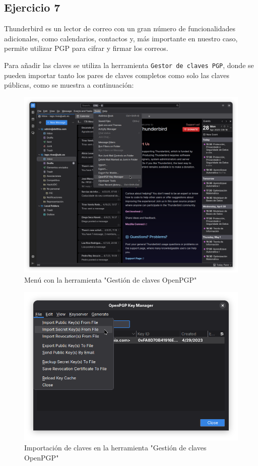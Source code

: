 \subsection{Ejercicio 7}
\graphicspath{ {img/07} }

Thunderbird es un lector de correo con un gran número de funcionalidades adicionales, como calendarios, contactos y, más importante en nuestro caso, permite utilizar PGP para cifrar y firmar los correos.

Para añadir las claves se utiliza la herramienta \texttt{Gestor de claves PGP}, donde se pueden importar tanto los pares de claves completos como solo las claves públicas, como se muestra a continuación:

\begin{figure}[H]
    \includegraphics[width=15cm]{thunderbird-tools-menu.png}
    \caption{Menú con la herramienta "Gestión de claves OpenPGP"}
\end{figure}

\begin{figure}[H]
    \includegraphics[width=15cm]{thunderbird-keymanager.png}
    \caption{Importación de claves en la herramienta "Gestión de claves OpenPGP"}
\end{figure}


